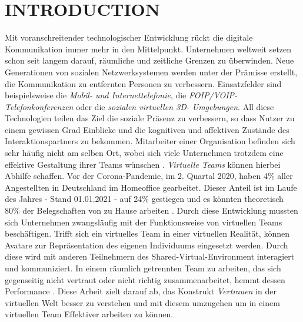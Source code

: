 \documentclass[sigchi]{acmart}
\begin{document}
\maketitle

\section{INTRODUCTION}
Mit voranschreitender technologischer Entwicklung rückt die digitale Kommunikation immer mehr in den Mittelpunkt. Unternehmen weltweit setzen schon seit langem darauf, räumliche und zeitliche Grenzen zu überwinden.
Neue Generationen von sozialen Netzwerksystemen werden unter der Prämisse erstellt, die Kommunikation zu entfernten Personen zu verbessern.
Einsatzfelder sind beispielsweise die \textit{Mobil- und Internettelefonie}, die\textit{ FOIP/VOIP- Telefonkonferenzen} oder die \textit{sozialen virtuellen 3D- Umgebungen}.
All diese Technologien teilen das Ziel die soziale Präsenz zu verbessern, so dass Nutzer zu einem gewissen Grad Einblicke und die kognitiven und affektiven Zustände des Interaktionspartners zu bekommen\citep[S. 407–447]{biocca2001plugging}.
Mitarbeiter einer Organisation befinden sich sehr häufig nicht am selben Ort, wobei sich viele Unternehmen trotzdem eine effektive Gestaltung ihrer Teams wünschen \citep[S. 791-792]{jarvenpaa1999communication}. \textit{Virtuelle Teams} können hierbei Abhilfe schaffen. 
Vor der Corona-Pandemie, im 2. Quartal 2020, haben 4\% aller Angestellten in Deutschland im Homeoffice gearbeitet. Dieser Anteil ist im Laufe des Jahres - Stand 01.01.2021 - auf 24\% gestiegen und es könnten theoretisch 80\% der Belegschaften von zu Hause arbeiten \citep{statistaCorona2020}. Durch diese Entwicklung mussten sich Unternehmen zwangsläufig mit der Funktionsweise von virtuellen Teams beschäftigen.
Trifft sich ein virtuelles Team in einer virtuellen Realität, können Avatare zur Repräsentation des eigenen Individuums eingesetzt werden. Durch diese wird mit anderen Teilnehmern des Shared-Virtual-Environment interagiert und kommuniziert. 
In einem räumlich getrennten Team zu arbeiten, das sich gegenseitig nicht vertraut oder nicht richtig zusammenarbeitet, hemmt dessen Performance \citep[S. 98-107]{huang1998supporting} \citep[S. 399-417]{turoff1993distributed}. Diese Arbeit zielt darauf ab, das Konstrukt \textit{Vertrauen} in der virtuellen Welt besser zu verstehen und mit diesem umzugehen um in einem virtuellen Team Effektiver arbeiten zu können.
\end{document}
